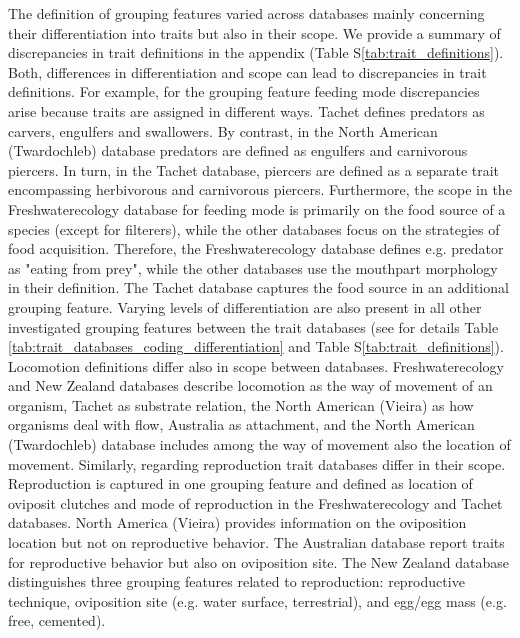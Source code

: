 \documentclass[../Draft_harmonization_paper.tex]{subfiles}
\begin{document}
The definition of grouping features varied across databases mainly concerning their differentiation into traits but also in their scope. We provide a summary of discrepancies in trait definitions in the appendix (Table S\ref{tab:trait_definitions}). Both, differences in differentiation and scope can lead to discrepancies in trait definitions. For example, for the grouping feature feeding mode discrepancies arise because traits are assigned in different ways. Tachet defines predators as carvers, engulfers and swallowers. By contrast, in the North American (Twardochleb) database predators are defined as engulfers and carnivorous piercers. In turn, in the Tachet database, piercers are defined as a separate trait encompassing herbivorous and carnivorous piercers. Furthermore, the scope in the Freshwaterecology database for feeding mode is primarily on the food source of a species (except for filterers), while the other databases focus on the strategies of food acquisition. Therefore, the Freshwaterecology database defines e.g. predator as "eating from prey", while the other databases use the mouthpart morphology in their definition. The Tachet database captures the food source in an additional grouping feature. Varying levels of differentiation are also present in all other investigated grouping features between the trait databases (see for details Table \ref{tab:trait_databases_coding_differentiation} and Table S\ref{tab:trait_definitions}). Locomotion definitions differ also in scope between databases. Freshwaterecology and New Zealand databases describe locomotion as the way of movement of an organism, Tachet as substrate relation, the North American (Vieira) as how organisms deal with flow, Australia as attachment, and the North American (Twardochleb) database includes among the way of movement also the location of movement. Similarly, regarding reproduction trait databases differ in their scope. Reproduction is captured in one grouping feature and defined as location of oviposit clutches and mode of reproduction in the Freshwaterecology and Tachet databases. North America (Vieira) provides information on the oviposition location but not on reproductive behavior. The Australian database report traits for reproductive behavior but also on oviposition site. The New Zealand database distinguishes three grouping features related to reproduction: reproductive technique, oviposition site (e.g. water surface, terrestrial), and egg/egg mass (e.g. free, cemented).
\end{document}
